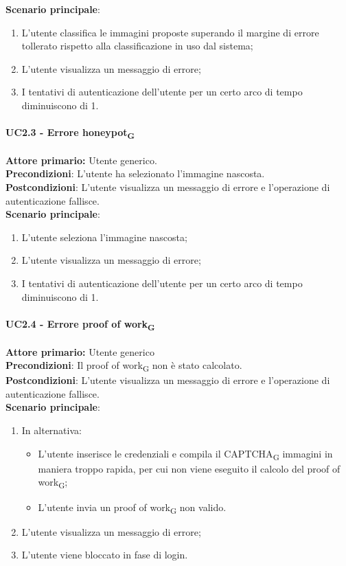 \textbf{Scenario principale}:
\begin{enumerate}
    \item L'utente classifica le immagini proposte superando il margine di errore tollerato rispetto alla classificazione in uso dal sistema;
	\item L’utente visualizza un messaggio di errore;
	\item I tentativi di autenticazione dell'utente per un certo arco di tempo diminuiscono di 1.
\end{enumerate}

\paragraph{UC2.3 - Errore honeypot\textsubscript{G}}
\textbf{Attore primario:} Utente generico.\\
\textbf{Precondizioni}: L’utente ha selezionato l'immagine nascosta.\\
\textbf{Postcondizioni}: L’utente visualizza un messaggio di errore e l’operazione di autenticazione fallisce.\\

\textbf{Scenario principale}:
\begin{enumerate}
    \item L'utente seleziona l'immagine nascosta;
	\item L’utente visualizza un messaggio di errore;
	\item I tentativi di autenticazione dell'utente per un certo arco di tempo diminuiscono di 1.
\end{enumerate}

\paragraph{UC2.4 - Errore proof of work\textsubscript{G}}
\textbf{Attore primario:} Utente generico\\
\textbf{Precondizioni}: Il proof of work\textsubscript{G} non è stato calcolato.\\
\textbf{Postcondizioni}: L’utente visualizza un messaggio di errore e l’operazione di autenticazione fallisce.\\

\textbf{Scenario principale}:
\begin{enumerate}
    \item In alternativa:
    \begin{itemize}
        \item L'utente inserisce le credenziali e compila il CAPTCHA\textsubscript{G} immagini in maniera troppo rapida, per cui non viene eseguito il calcolo del proof of work\textsubscript{G};
        \item L'utente invia un proof of work\textsubscript{G} non valido.
    \end{itemize}
	\item L’utente visualizza un messaggio di errore;
	\item L'utente viene bloccato in fase di login.
\end{enumerate}

